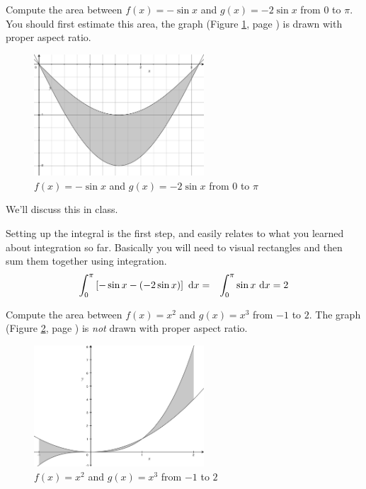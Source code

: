 \documentclass[12pt,addpoints, answers, fleqn]{exam}
\begin{document}
\begin{questions}
\question Compute the area between $f\left(x\right) = - \sin x$ and $g\left(x\right) = - 2\sin x$ from $0$ to $\pi$. You should first estimate this area, the graph (Figure \ref{fig:graph3105}, page \pageref{fig:graph3105}) is drawn with proper aspect ratio.
\begin{figure}[htbp] %
   \centering
   \includegraphics[width=2.5in]{./graphics/graph3105.pdf} 
   \caption{$f\left(x\right) = - \sin x$ and $g\left(x\right) = - 2\sin x$ from $0$ to $\pi$}
   \label{fig:graph3105}
\end{figure}

\begin{solution}
We'll discuss this in class.

Setting up the integral is the first step, and easily relates to what you learned about integration so far. Basically you will need to visual rectangles and then sum them together using integration.
\begin{eqnarray*}
\int_0^{\pi} \left[ -\sin x - \left( - 2\sin x \right) \right] \  {\rm{d}}x &=& \int_0^{\pi} \sin x \ {\rm{d}} x = 2
\end{eqnarray*}
\end{solution}



\question Compute the area between $f\left(x\right) = x^2$ and $g\left(x\right) = x^3$ from $-1$ to $2$. The graph (Figure \ref{fig:graph3106}, page \pageref{fig:graph3106}) is \emph{not} drawn with proper aspect ratio.
\begin{figure}[htbp] %
   \centering
   \includegraphics[width=2.5in]{./graphics/graph3106.pdf} 
   \caption{$f\left(x\right) = x^2$ and $g\left(x\right) = x^3$ from $-1$ to $2$}
   \label{fig:graph3106}
\end{figure}


\end{questions}
\end{document}
